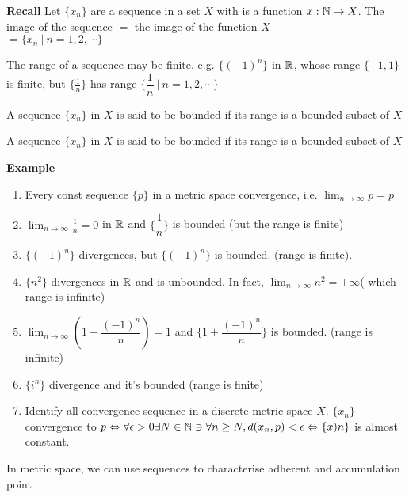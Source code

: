 \textbf{Recall} Let $\{x_n\}$ are a sequence in a set $X$ with is a function $x:\mathbb{N} \rightarrow X$. The image of the sequence $=$ the image of the function $X$  \\  $=\{x_n~|~ n = 1,2,\cdots\}$

\begin{rmk*}
	The range of a sequence may be finite. e.g. $\{(-1)^n\}$ in $\mathbb{R}$, whose range $\{-1,1\}$ is finite, but $\{\frac{1}{n}\} $ has range $\{\dfrac{1}{n}~|~ n = 1,2,\cdots\}$
\end{rmk*}

\begin{defn}
	A sequence $\{x_n\}$ in $X$ is said to be bounded if its range is a bounded subset of $X$
\end{defn}

\begin{rmk*}
	A sequence $\{x_n\}$ in $X$ is said to be bounded if its range is a bounded subset of $X$
\end{rmk*}

\newpage

\textbf{Example}

\begin{enumerate}[wide]
	\item Every const sequence $\{p\}$ in a metric space convergence, i.e. $\lim_{n \rightarrow \infty} p = p$
	\item $\lim_{n \rightarrow \infty}\frac{1}{n} = 0$ in $\mathbb{R}$ and $\{\dfrac{1}{n}\}$ is bounded (but the range is finite)
	\item $\{(-1)^n\}$ divergences, but $\{(-1)^n\}$ is bounded. (range is finite).
	\item $\{n^2\}$ divergences in $\mathbb{R}$ and is unbounded. In fact, $\lim_{n \rightarrow \infty}n^2 = + \infty$( which range is infinite)
	\item $\lim_{n \rightarrow \infty}(1 + \dfrac{(-1)^n}{n}) = 1$ and $\{1 + \dfrac{(-1)^n}{n}\}$ is bounded. (range is infinite)
	\item $\{i^n\}$ divergence and it's bounded (range is finite)
	\item Identify all convergence sequence in a discrete metric space $X$. $\{x_n\}$ convergence to $p \Leftrightarrow \forall \epsilon > 0 \exists N \in \mathbb{N} \ni \forall n \geq N, d(x_n,p) < \epsilon \Leftrightarrow \{x)n\}$ is almost constant.
\end{enumerate}

In metric space, we can use sequences to characterise adherent and accumulation point

